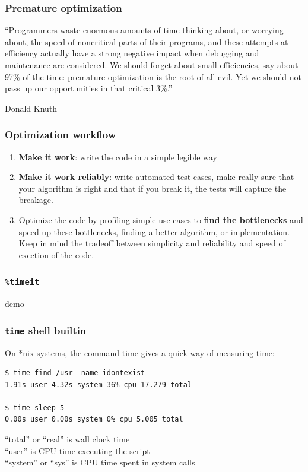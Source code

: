 \documentclass[serif]{beamer}
\begin{document}
\begin{frame}
  \frametitle{Premature optimization}

  ``Programmers waste enormous amounts of time thinking about, or
  worrying about, the speed of noncritical parts of their programs,
  and these attempts at efficiency actually have a strong negative
  impact when debugging and maintenance are considered. We should
  forget about small efficiencies, say about 97\% of the time:
  premature optimization is the root of all evil. Yet we should not
  pass up our opportunities in that critical 3\%.''

  \hfill Donald Knuth
\end{frame}

\begin{frame}
  \frametitle{Optimization workflow}

  \begin{enumerate}
  \item \textbf{Make it work}: write the code in a simple legible way

  \item \textbf{Make it work reliably}: write automated test cases,
    make really sure that your algorithm is right and that if you
    break it, the tests will capture the breakage.

  \item Optimize the code by profiling simple use-cases to
    \textbf{find the bottlenecks} and speed up these bottlenecks,
    finding a better algorithm, or implementation.
    Keep in mind the tradeoff between simplicity and reliability
    and speed of exection of the code.
  \end{enumerate}
\end{frame}

\begin{frame}
  \frametitle{\texttt{\%timeit}}

  demo
\end{frame}

\begin{frame}[fragile]
  \frametitle{\texttt{time} shell builtin}

  On *nix systems, the command time gives a quick way of measuring time:

  \begin{verbatim}
$ time find /usr -name idontexist
1.91s user 4.32s system 36% cpu 17.279 total
    
$ time sleep 5
0.00s user 0.00s system 0% cpu 5.005 total
  \end{verbatim}

``total'' or ``real'' is wall clock time\\
``user'' is CPU time executing the script\\
``system'' or ``sys'' is CPU time spent in system calls
\end{frame}
\end{document}
